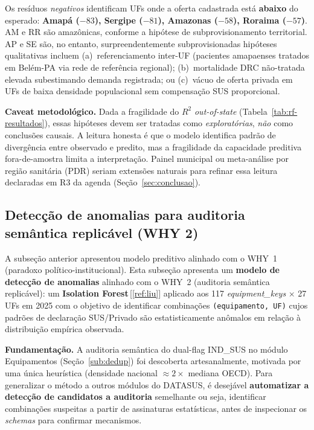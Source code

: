 \documentclass[12pt,a4paper,oneside]{article}
\begin{document}
Os resíduos \textit{negativos} identificam UFs onde a oferta
cadastrada está \textbf{abaixo} do esperado: \textbf{Amapá
($-83$), Sergipe ($-81$), Amazonas ($-58$), Roraima ($-57$)}.
AM e RR são amazônicas, conforme a hipótese de
subprovisionamento territorial. AP e SE são, no entanto,
surpreendentemente subprovisionadas \textemdash{} hipóteses
qualitativas incluem (a)~referenciamento inter-UF (pacientes
amapaenses tratados em Belém-PA via rede de referência regional);
(b)~mortalidade DRC não-tratada elevada subestimando demanda
registrada; ou (c)~vácuo de oferta privada em UFs de baixa
densidade populacional sem compensação SUS proporcional.

\textbf{Caveat metodológico.} Dada a fragilidade do $R^2$
\textit{out-of-state} (Tabela~\ref{tab:rf-resultados}), essas
hipóteses devem ser tratadas como \textit{exploratórias},
\textit{não} como conclusões causais. A leitura honesta é que o
modelo identifica padrão de divergência entre observado e
predito, mas a fragilidade da capacidade preditiva fora-de-amostra
limita a interpretação. Painel municipal ou meta-análise por
região sanitária (PDR) seriam extensões naturais para refinar
essa leitura \textemdash{} declaradas em R3 da agenda
(Seção~\ref{sec:conclusao}).

\subsection{Detecção de anomalias para auditoria semântica
replicável (WHY 2)}\label{sub:ml-anomaly}

A subseção anterior apresentou modelo preditivo alinhado com o
WHY~1 (paradoxo político-institucional). Esta subseção apresenta
um \textbf{modelo de detecção de anomalias} alinhado com o WHY~2
(auditoria semântica replicável): um \textbf{Isolation
Forest}\,[\ref{ref:liu}] aplicado aos 117 \textit{equipment\_keys}
$\times$ 27 UFs em 2025 com o objetivo de identificar combinações
\texttt{(equipamento, UF)} cujos padrões de declaração SUS/Privado
são estatisticamente anômalos em relação à distribuição empírica
observada.

\textbf{Fundamentação.} A auditoria semântica do dual-flag
IND\_SUS no módulo Equipamentos (Seção~\ref{sub:dedup}) foi
descoberta artesanalmente, motivada por uma única heurística
(densidade nacional $\approx 2\times$ mediana OECD). Para
generalizar o método a outros módulos do DATASUS, é desejável
\textbf{automatizar a detecção de candidatos a auditoria}
semelhante \textemdash{} ou seja, identificar combinações
suspeitas a partir de assinaturas estatísticas, antes de
inspecionar os \textit{schemas} para confirmar mecanismos.
\end{document}

